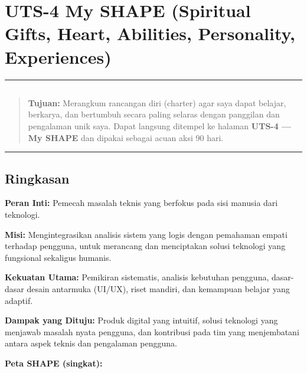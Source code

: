 \documentclass[
  letterpaper,
  DIV=11,
  numbers=noendperiod]{scrreprt}
\begin{document}

\chapter{UTS-4 My SHAPE (Spiritual Gifts, Heart, Abilities, Personality,
Experiences)}\label{uts-4-my-shape-spiritual-gifts-heart-abilities-personality-experiences}

\begin{center}\rule{0.5\linewidth}{0.5pt}\end{center}

\section{}\label{section}

\begin{quote}
\textbf{Tujuan:} Merangkum rancangan diri (charter) agar saya dapat
belajar, berkarya, dan bertumbuh secara paling selaras dengan panggilan
dan pengalaman unik saya. Dapat langsung ditempel ke halaman
\textbf{UTS-4 --- My SHAPE} dan dipakai sebagai acuan aksi 90 hari.
\end{quote}

\begin{center}\rule{0.5\linewidth}{0.5pt}\end{center}

\section{Ringkasan}\label{ringkasan}

\textbf{Peran Inti:} Pemecah masalah teknis yang berfokus pada sisi
manusia dari teknologi.

\textbf{Misi:} Mengintegrasikan analisis sistem yang logis dengan
pemahaman empati terhadap pengguna, untuk merancang dan menciptakan
solusi teknologi yang fungsional sekaligus humanis.

\textbf{Kekuatan Utama:} Pemikiran sistematis, analisis kebutuhan
pengguna, dasar-dasar desain antarmuka (UI/UX), riset mandiri, dan
kemampuan belajar yang adaptif.

\textbf{Dampak yang Dituju:} Produk digital yang intuitif, solusi
teknologi yang menjawab masalah nyata pengguna, dan kontribusi pada tim
yang menjembatani antara aspek teknis dan pengalaman pengguna.

\textbf{Peta SHAPE (singkat):}
\end{document}
